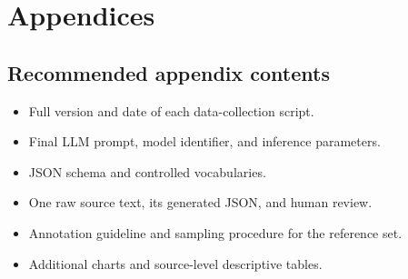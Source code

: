 \appendix
\chapter{Appendices}
\section{Recommended appendix contents}
\begin{itemize}
\item Full version and date of each data-collection script.
\item Final LLM prompt, model identifier, and inference parameters.
\item JSON schema and controlled vocabularies.
\item One raw source text, its generated JSON, and human review.
\item Annotation guideline and sampling procedure for the reference set.
\item Additional charts and source-level descriptive tables.
\end{itemize}

